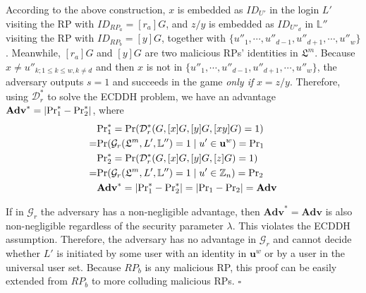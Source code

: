 According to the above construction, %
$x$ is embedded as $ID_{U'}$ in the login $L'$ visiting the RP with $ID_{RP_{a}} = [r_{a}]G$,
and $z/y$ is embedded as $ID_{U''_d}$ in $\mathbb{L}''$ visiting the RP with $ID_{RP_{b}}=[y]G$,
together with $\{u''_1, \cdots, u''_{d-1}, u''_{d+1}, \cdots, u''_w\}$.
Meanwhile, $[r_{a}]G$ and $[y]G$ are two malicious RPs' identities in $\mathfrak{L}^m$.
Because $x \neq u''_{k; 1\leq k \leq w, k \neq d}$ and then $x$ is not in $\{u''_1, \cdots, u''_{d-1}, u''_{d+1}, \cdots, u''_w\}$, the adversary outputs $s=1$ and succeeds in the game \emph{only if} $x = z/y$.
 Therefore, using $\mathcal{D}^*_r$ to solve the ECDDH problem, we have an advantage $\mathbf{Adv}^*=|{\rm Pr}^*_1 - {\rm Pr}^*_2|$, where
\begin{align*}
&{\rm Pr}^*_1 =  {\rm Pr}(\mathcal{D}^*_r(G, [x]G, [y]G, [xy]G)=1) \\
=&{\rm Pr}(\mathcal{G}_r(\mathfrak{L}^m, L', \mathbb{L}'')=1 \; | \; u' \in \mathbf{u}^w) = {\rm Pr}_1 \\
&{\rm Pr}^*_2= {\rm Pr}(\mathcal{D}^*_r(G, [x]G, [y]G, [z]G)=1) \\
=&{\rm Pr}(\mathcal{G}_r(\mathfrak{L}^m, L', \mathbb{L}'')=1 \; | \; u' \in \mathbb{Z}_n) = {\rm Pr}_2 \\
&\mathbf{Adv}^*=|{\rm Pr}^*_1-{\rm Pr}^*_2|=|{\rm Pr}_1-{\rm Pr}_2|={\mathbf{Adv}}
\end{align*}

If in $\mathcal{G}_r$ the adversary has a non-negligible advantage, then $\mathbf{Adv}^*={\mathbf{Adv}}$ is also non-negligible regardless of the security parameter $\lambda$. This violates the ECDDH assumption.
 Therefore, the adversary has no advantage in $\mathcal{G}_r$ and cannot decide whether $L'$ is initiated by some user with an identity in $\mathbf{u}^w$ or by a user in the universal user set.
Because $RP_b$ is any malicious RP, this proof can be easily extended from $RP_b$ to more colluding malicious RPs.
\hfill $\square$


